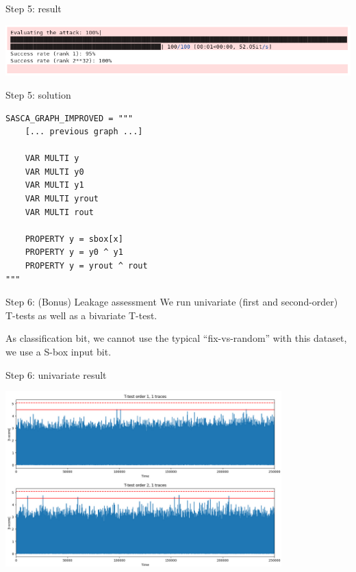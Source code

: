 \documentclass[aspectratio=169]{beamer}
\begin{document}
\begin{frame}{Step 5: result}
    \begin{center}
        \includegraphics[width=\textwidth]{figures/res_step5.png}
    \end{center}
\end{frame}

\begin{frame}[containsverbatim]{Step 5: solution}
    \footnotesize
    \begin{verbatim}
SASCA_GRAPH_IMPROVED = """
    [... previous graph ...]

    VAR MULTI y
    VAR MULTI y0
    VAR MULTI y1
    VAR MULTI yrout
    VAR MULTI rout

    PROPERTY y = sbox[x]
    PROPERTY y = y0 ^ y1
    PROPERTY y = yrout ^ rout
"""
    \end{verbatim}
\end{frame}

\begin{frame}{Step 6: (Bonus) Leakage assessment}
    We run univariate (first and second-order) T-tests as well as a bivariate T-test.

    As classification bit, we cannot use the typical ``fix-vs-random'' with
    this dataset, we use a S-box input bit.
\end{frame}

\begin{frame}{Step 6: univariate result}
    \begin{center}
        \includegraphics[width=0.8\textwidth]{figures/res_step6a.png}
    \end{center}
\end{frame}
\end{document}
